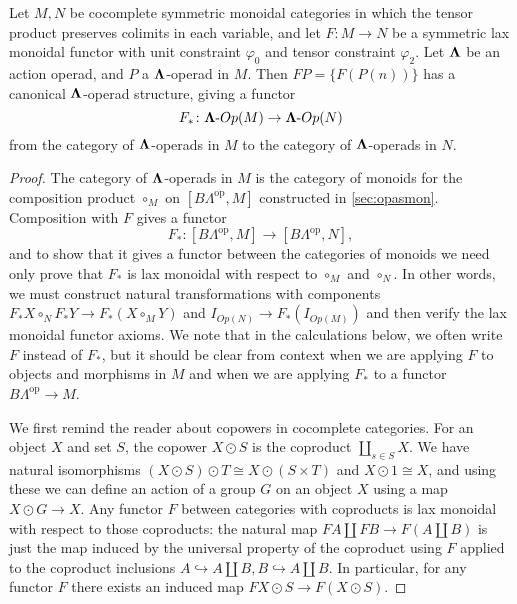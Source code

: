 \begin{thm}\label{preserveGop}
Let $M,N$ be cocomplete symmetric monoidal categories in which the tensor product preserves colimits in each variable, and let $F \colon M \rightarrow N$ be a symmetric lax monoidal functor with unit constraint $\varphi_{0}$ and tensor constraint $\varphi_{2}$. Let $\mathbf{\Lambda}$ be an action operad, and $P$ a $\mathbf{\Lambda}$-operad in $M$. Then $FP = \{ F(P(n)) \}$ has a canonical $\mathbf{\Lambda}$-operad structure, giving a functor
  \[
    F_{*} \colon \mathbf{\Lambda}\mbox{-}Op(M) \rightarrow \mathbf{\Lambda}\mbox{-}Op(N)
  \]
from the category of $\mathbf{\Lambda}$-operads in $M$ to the category of $\mathbf{\Lambda}$-operads in $N$.
\end{thm}
\begin{proof}
The category of $\mathbf{\Lambda}$-operads in $M$ is the category of monoids for the composition product $\circ_{M}$ on $[B\Lambda^{\textrm{op}}, M]$ constructed in \cref{sec:opasmon}. Composition with $F$ gives a functor
  \[
    F_{*} \colon  [B\Lambda^{\textrm{op}}, M] \rightarrow [B\Lambda^{\textrm{op}}, N],
  \]
  and to show that it gives a functor between the categories of monoids we need only prove that $F_{*}$ is lax monoidal with respect to $\circ_{M}$ and $\circ_{N}$. In other words, we must construct natural transformations with components $F_{*}X \circ_{N} F_{*}Y \rightarrow F_{*}(X \circ_{M} Y)$ and $I_{Op(N)} \rightarrow F_{*}(I_{Op(M)})$ and then verify the lax monoidal functor axioms. We note that in the calculations below, we often write $F$ instead of $F_{*}$, but it should be clear from context when we are applying $F$ to objects and morphisms in $M$ and when we are applying $F_{*}$ to a functor $ B\Lambda^{\textrm{op}} \rightarrow M$.

We first remind the reader about copowers in cocomplete categories. For an object $X$ and set $S$, the copower $X \odot S$ is the coproduct $\coprod_{s \in S} X$. We have natural isomorphisms $(X \odot S) \odot T \cong X \odot (S \times T)$ and $X \odot 1 \cong X$, and using these we can define an action of a group $G$ on an object $X$ using a map $X \odot G \rightarrow X$. Any functor $F$ between categories with coproducts is lax monoidal with respect to those coproducts:  the natural map $FA \coprod FB \rightarrow F(A \coprod B)$ is just the map induced by the universal property of the coproduct using $F$ applied to the coproduct inclusions $A \hookrightarrow A \coprod B, B \hookrightarrow A \coprod B$. In particular, for any functor $F$ there exists an induced map $FX \odot S \rightarrow F(X \odot S)$.


\end{proof}
